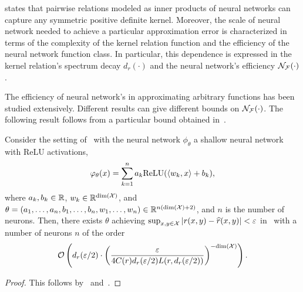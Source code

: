  states that pairwise relations modeled as inner products of neural networks can capture any symmetric positive definite kernel. Moreover, the scale of neural network needed to achieve a particular approximation error is characterized in terms of the complexity of the kernel relation function and the efficiency of the neural network function class. In particular, this dependence is expressed in the kernel relation's spectrum decay $d_r(\cdot)$ and the neural network's efficiency ${\mathcal{N}}_{\mathcal{F}}(\cdot)$.

The efficiency of neural network's in approximating arbitrary functions has been studied extensively. Different results can give different bounds on ${\mathcal{N}}_{\mathcal{F}}(\cdot)$. The following result follows from a particular bound obtained in~\parencite{poggioWhyWhenCan2017}.

\begin{corollary}\label{cor:sym_iprod_kernel_neuron_bound}
	Consider the setting of~ with the neural network $\phi_\theta$ a shallow neural network with ReLU activations,
	\begin{equation*}
		\phi_\theta(x) = \sum_{k=1}^{n} a_k \mathrm{ReLU}(\iprod{w_k}{x} + b_k),
	\end{equation*}
	where $a_k, b_k \in \mathbb{R}$, $w_k \in \mathbb{R}^{\mathrm{dim}({\mathcal{X}})}$, and $\theta = (a_1, \ldots, a_n, b_1, \ldots, b_n, w_1, \ldots, w_n) \in \mathbb{R}^{n (\mathrm{dim}({\mathcal{X}}) + 2)}$, and $n$ is the number of neurons. Then, there exists $\theta$ achieving $\sup_{x,y \in \mathcal{X}}{\left\lvert r(x,y) - \widehat{r}(x,y)\right\rvert} < \varepsilon$ in~ with a number of neurons $n$ of the order
	\[{\mathcal{O}}\left(d_r(\varepsilon / 2) \cdot \left(\frac{\varepsilon}{4 C(r) d_r(\varepsilon / 2) L(r, d_r(\varepsilon/2))}\right)^{-\mathrm{dim}({\mathcal{X}})}\right).\]
\end{corollary}
\begin{proof}
	This follows by~ and~\parencite[Theorem 4]{poggioWhyWhenCan2017}.
\end{proof}


